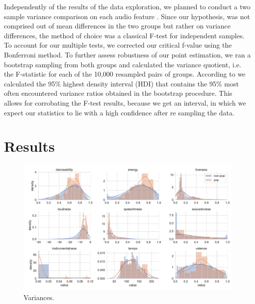 \documentclass{article}
\begin{document}
Independently of the results of the data exploration, we planned to conduct a two sample variance comparison on each audio feature \citep{snedecor1989}. Since our hypothesis, was not comprised out of mean differences in the two groups but rather on variance differences, the method of choice was a classical F-test for independent samples. To account for our multiple tests, we corrected our critical f-value using the Bonferroni method. To further assess robustness of our point estimation, we ran a bootstrap sampling from both groups and calculated the variance quotient, i.e. the F-statistic for each of the 10,000 resampled pairs of groups. According to \cite{kruschke2014doing}
we calculated the 95\% highest density interval (HDI) that contains the 95\%  most often encountered variance ratios obtained in the bootstrap procedure. This allows for corrobating the F-test results, because we get an interval, in which we expect our statistics to lie with a high confidence after re sampling the data.

\section{Results}

\begin{figure}
  \centering
  \includegraphics[width=1\linewidth]{../fig/002_variances.pdf}
  \vspace*{-15mm}
  \caption{Variances.}
\end{figure}
\end{document}
